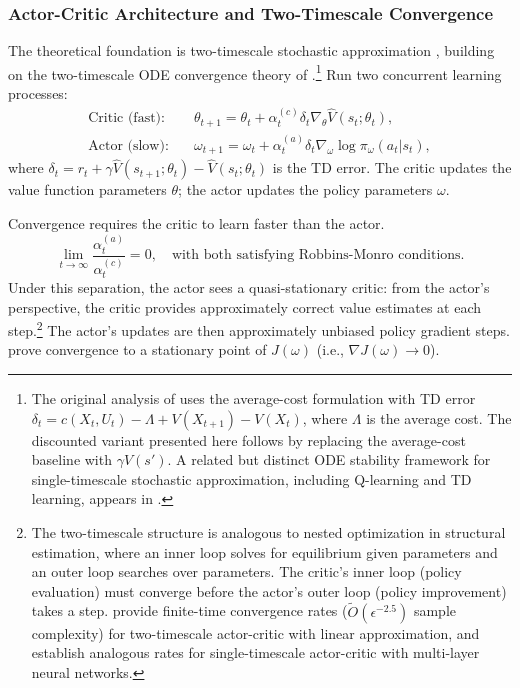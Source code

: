 \subsubsection{Actor-Critic Architecture and Two-Timescale Convergence}

The theoretical foundation is two-timescale stochastic approximation \citep{konda2000}, building on the two-timescale ODE convergence theory of \citet{borkar1997}.\footnote{The original analysis of \citet{konda2000} uses the average-cost formulation with TD error $\delta_t = c(X_t, U_t) - \Lambda + V(X_{t+1}) - V(X_t)$, where $\Lambda$ is the average cost. The discounted variant presented here follows by replacing the average-cost baseline with $\gamma V(s')$. A related but distinct ODE stability framework for single-timescale stochastic approximation, including Q-learning and TD learning, appears in \citet{borkar2000}.} Run two concurrent learning processes:
\begin{align}
\text{Critic (fast):} \quad & \theta_{t+1} = \theta_t + \alpha_t^{(c)} \delta_t \nabla_\theta \hat{V}(s_t; \theta_t), \\
\text{Actor (slow):} \quad & \omega_{t+1} = \omega_t + \alpha_t^{(a)} \delta_t \nabla_\omega \log \pi_\omega(a_t|s_t),
\end{align}
where $\delta_t = r_t + \gamma \hat{V}(s_{t+1}; \theta_t) - \hat{V}(s_t; \theta_t)$ is the TD error. The critic updates the value function parameters $\theta$; the actor updates the policy parameters $\omega$.

Convergence requires the critic to learn faster than the actor.
\begin{equation}
\lim_{t \to \infty} \frac{\alpha_t^{(a)}}{\alpha_t^{(c)}} = 0, \quad \text{with both satisfying Robbins-Monro conditions.}
\end{equation}
Under this separation, the actor sees a quasi-stationary critic: from the actor's perspective, the critic provides approximately correct value estimates at each step.\footnote{The two-timescale structure is analogous to nested optimization in structural estimation, where an inner loop solves for equilibrium given parameters and an outer loop searches over parameters. The critic's inner loop (policy evaluation) must converge before the actor's outer loop (policy improvement) takes a step. \citet{wu2020twotimescale} provide finite-time convergence rates ($\tilde{O}(\epsilon^{-2.5})$ sample complexity) for two-timescale actor-critic with linear approximation, and \citet{tian2023} establish analogous rates for single-timescale actor-critic with multi-layer neural networks.} The actor's updates are then approximately unbiased policy gradient steps. \citet{konda2000} prove convergence to a stationary point of $J(\omega)$ (i.e., $\nabla J(\omega) \to 0$).

